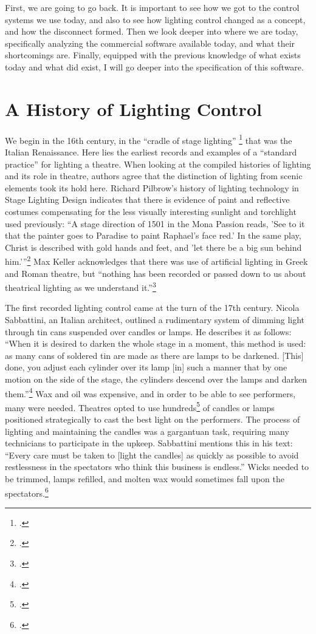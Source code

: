 \documentclass[
    12pt,
    twoside,
    bibstyle=chicago,
    headerstyle=uppercase,
	bibfile=biblatex_updating.bib
]{reedthesis}
\begin{document}
First, we are going to go back. It is important to see how we got to the control systems we use today, and also to see how lighting control changed as a concept, and how the disconnect formed. Then we look deeper into where we are today, specifically analyzing the commercial software available today, and what their shortcomings are. Finally, equipped with the previous knowledge of what exists today and what did exist, I will go deeper into the specification of this software.


\section{A History of Lighting Control}
We begin in the 16th century, in the “cradle of stage lighting” \footcite[p. 163]{pilbrowStageLightingDesign1997} that was the Italian Renaissance. Here lies the earliest records and examples of a “standard practice” for lighting a theatre. When looking at the compiled histories of lighting and its role in theatre, authors agree that the distinction of lighting from scenic elements took its hold here. Richard Pilbrow's history of lighting technology in Stage Lighting Design indicates that there is evidence of paint and reflective costumes compensating for the less visually interesting sunlight and torchlight used previously: “A stage direction of 1501 in the Mona Passion reads, 'See to it that the painter goes to Paradise to paint Raphael's face red.' In the same play, Christ is described with gold hands and feet, and 'let there be a big sun behind him.'”\footcite[p. 166-167]{pilbrowStageLightingDesign1997} Max Keller acknowledges that there was use of artificial lighting in Greek and Roman theatre, but “nothing has been recorded or passed down to us about theatrical lighting as we understand it.”\footcite[p. 33]{kellerLightFantasticArt2006}

The first recorded lighting control came at the turn of the 17th century. Nicola Sabbattini, an Italian architect, outlined a rudimentary system of dimming light through tin cans suspended over candles or lamps. He describes it as follows: “When it is desired to darken the whole stage in a moment, this method is used: as many cans of soldered tin are made as there are lamps to be darkened. [This] done, you adjust each cylinder over its lamp [in] such a manner that by one motion on the side of the stage, the cylinders descend over the lamps and darken them.”\footcite[p. 111-112]{hewittRenaissanceStageDocuments1958} Wax and oil was expensive, and in order to be able to see performers, many were needed. Theatres opted to use hundreds\footcite[p. 173]{pilbrowStageLightingDesign1997} of candles or lamps positioned strategically to cast the best light on the performers. The process of lighting and maintaining the candles was a gargantuan task, requiring many technicians to participate in the upkeep. Sabbattini mentions this in his text: “Every care must be taken to [light the candles] as quickly as possible to avoid restlessness in the spectators who think this business is endless.” Wicks needed to be trimmed, lamps refilled, and molten wax would sometimes fall upon the spectators.\footcite[p. 97]{hewittRenaissanceStageDocuments1958}
\end{document}
